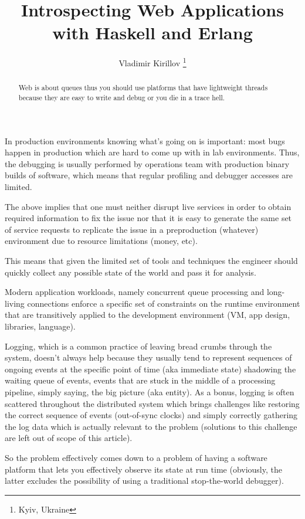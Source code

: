 \documentclass[10pt, a5paper]{article}
\begin{document}
\title{Introspecting Web Applications with Haskell and Erlang}
\author{Vladimir Kirillov \footnote{Kyiv, Ukraine}}
\maketitle

\begin{abstract}
Web is about queues thus you should use platforms that have lightweight threads because they are easy to write and debug or you die in a trace hell.
\end{abstract}

In production environments knowing what's going on is important: most bugs happen in production which are hard to come up with in lab environments. Thus, the debugging is usually performed by operations team with production binary builds of software, which means that regular profiling and debugger accesses are limited.

The above implies that one must neither disrupt live services in order to obtain required information to fix the issue nor that it is easy to generate the same set of service requests to replicate the issue in a preproduction (whatever) environment due to resource limitations (money, etc).

This means that given the limited set of tools and techniques the engineer should quickly collect any possible state of the world and pass it for analysis.

Modern application workloads, namely concurrent queue processing and long-living connections enforce a specific set of constraints on the runtime environment that are transitively applied to the development environment (VM, app design, libraries, language).

Logging, which is a common practice of leaving bread crumbs through the system, doesn't always help because they usually tend to represent sequences of ongoing events at the specific point of time (aka immediate state) shadowing the waiting queue of events, events that are stuck in the middle of a processing pipeline, simply saying, the big picture (aka entity). As a bonus, logging is often scattered throughout the distributed system which brings challenges like restoring the correct sequence of events (out-of-sync clocks) and simply correctly gathering the log data which is actually relevant to the problem (solutions to this challenge are left out of scope of this article).

So the problem effectively comes down to a problem of having a software platform that lets you effectively observe its state at run time (obviously, the latter excludes the possibility of using a traditional stop-the-world debugger).
\end{document}
